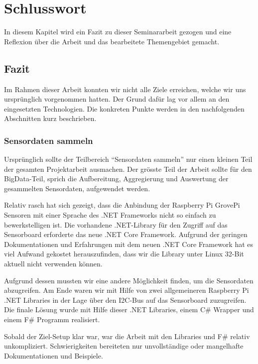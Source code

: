 
\chapter{Schlusswort} \label{chap:Finish}
In diesem Kapitel wird ein Fazit zu dieser Seminararbeit gezogen und eine Reflexion über die Arbeit und das bearbeitete Themengebiet gemacht.

\section{Fazit}
Im Rahmen dieser Arbeit konnten wir nicht alle Ziele erreichen, welche wir uns ursprünglich vorgenommen hatten. Der Grund dafür lag vor allem an den eingesetzten Technologien. Die konkreten Punkte werden in den nachfolgenden Abschnitten kurz beschrieben.

\subsection{Sensordaten sammeln}
Ursprünglich sollte der Teilbereich "`Sensordaten sammeln"' nur einen kleinen Teil der gesamten Projektarbeit ausmachen. Der grösste Teil der Arbeit sollte für den BigData-Teil, sprich die Aufbereitung, Aggregierung und Auswertung der gesammelten Sensordaten, aufgewendet werden. 

Relativ rasch hat sich gezeigt, dass die Anbindung der Raspberry Pi GrovePi Sensoren mit einer Sprache des .NET Frameworks nicht so einfach zu bewerkstelligen ist. Die vorhandene .NET-Library für den Zugriff auf das Sensorboard erforderte das neue .NET Core Framework. Aufgrund der geringen Dokumentationen und Erfahrungen mit dem neuen .NET Core Framework hat es viel Aufwand gekostet herauszufinden, dass wir die Library unter Linux 32-Bit aktuell nicht verwenden können.

Aufgrund dessen mussten wir eine andere Möglichkeit finden, um die Sensordaten abzugreifen. Am Ende waren wir mit Hilfe von zwei allgemeineren Raspberry Pi .NET Libraries in der Lage über den I2C-Bus auf das Sensorboard zuzugreifen. Die finale Lösung wurde mit Hilfe dieser .NET Libraries, einem C\# Wrapper und einem F\# Programm realisiert.

Sobald der Ziel-Setup klar war, war die Arbeit mit den Libraries und F\# relativ unkompliziert. Schwierigkeiten bereiteten nur unvollständige oder mangelhafte Dokumentationen und Beispiele.

